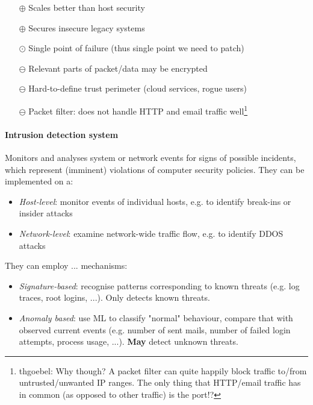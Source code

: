 \begin{itemize}
    \item[$\oplus$] Scales better than host security
    \item[$\oplus$] Secures insecure legacy systems
    \item[$\odot$] Single point of failure (thus single point we need to patch)

    \item[$\ominus$] Relevant parts of packet/data may be encrypted
    \item[$\ominus$] Hard-to-define trust perimeter (cloud services, rogue users)
    \item[$\ominus$] Packet filter: does not handle HTTP and email traffic well\footnote{thgoebel: Why though? A packet filter can quite happily block traffic to/from untrusted/unwanted IP ranges. The only thing that HTTP/email traffic has in common (as opposed to other traffic) is the port!?}
\end{itemize}

\paragraph{Intrusion detection system} Monitors and analyses system or network events for signs of possible incidents, which represent (imminent) violations of computer security policies. They can be implemented on a:

\begin{itemize}
    \item \emph{Host-level}: monitor events of individual hosts, e.g. to identify break-ins or insider attacks
    \item \emph{Network-level}: examine network-wide traffic flow, e.g. to identify DDOS attacks
\end{itemize}

They can employ ... mechanisms:

\begin{itemize}
    \item \emph{Signature-based}: recognise patterns corresponding to known threats (e.g. log traces, root logins, ...). Only detects known threats.
    \item \emph{Anomaly based}: use ML to classify "normal" behaviour, compare that with observed current events (e.g. number of sent mails, number of failed login attempts, process usage, ...). \textbf{May} detect unknown threats.
\end{itemize}

